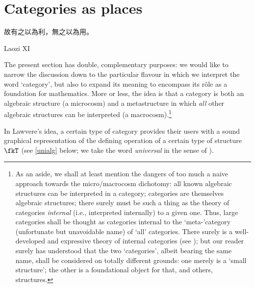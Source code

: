\section{Categories as places}\label{as_places}
\epigraph{\begin{CJK}{UTF8}{bsmi} 故有之以為利，無之以為用。 \end{CJK}}{Laozi XI}
The present section has double, complementary purposes: we would like to narrow the discussion down to the particular flavour in which we interpret the word `category', but also to expand its meaning to encompass its r\^ole as a foundation for mathematics. More or less, the idea is that a category is both an algebraic structure (a microcosm) and a metastructure in which \emph{all} other algebraic structures can be interpreted (a macrocosm).\footnote{As an aside, we shall at least mention the dangers of too much a naive approach towards the micro/macrocosm dichotomy: all known algebraic structures can be interpreted in a category; categories are themselves algebraic structures; there surely must be such a thing as the theory of categories \emph{internal} (i.e., interpreted internally) to a given one. Thus, large categories shall be thought as categories internal to the `meta-'category (unfortunate but unavoidable name) of `all' categories. There surely is a well-developed and expressive theory of internal categories (see \cite[Ch. 8]{Bor1}); but our reader surely has understood that the two `categories', albeit bearing the same name, shall be considered on totally different grounds: one merely is a `small structure'; the other is a foundational object for that, and others, structures.}

In Lawvere's idea, a certain type of category provides their users with a sound graphical representation of the defining operation of a certain type of structure $\fkT$ (see \autoref{unialg} below; we take the word \emph{universal} in the sense of \cite[XV.1]{grillet2007abstract}).

